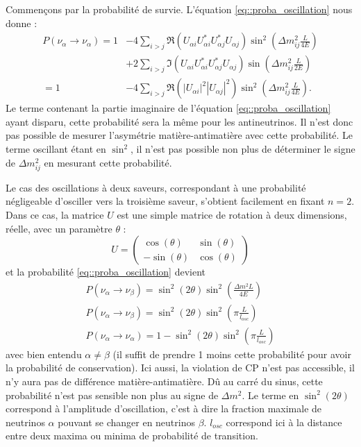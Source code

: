         Commençons par la probabilité de survie. L'équation \eqref{eq::proba_oscillation} nous donne :
        \begin{equation}\label{eq::proba_non_oscillation}
          \begin{split}
            P(\nu_{\alpha}\to\nu_{\alpha}) = 1 & - 4\sum_{i>j}\Re(U_{\alpha i}U_{\alpha i}^*U_{\alpha j}^*U_{\alpha j})\sin^2\left(\Delta m_{ij}^2\frac{L}{4E}\right) \\
            & + 2\sum_{i>j}\Im(U_{\alpha i}U_{\alpha i}^*U_{\alpha j}^*U_{\alpha j})\sin\left(\Delta m_{ij}^2\frac{L}{2E}\right) \\
            = 1 & -4\sum_{i>j}\Re(|U_{\alpha i}|^2|U_{\alpha j}|^2)\sin^2\left(\Delta m_{ij}^2\frac{L}{4E}\right).
          \end{split}
        \end{equation}
        Le terme contenant la partie imaginaire de l'équation \eqref{eq::proba_oscillation} ayant disparu, cette probabilité sera la même pour les antineutrinos. Il n'est donc pas possible de mesurer l'asymétrie matière-antimatière avec cette probabilité. Le terme oscillant étant en $\sin^2$, il n'est pas possible non plus de déterminer le signe de $\Delta m_{ij}^2$ en mesurant cette probabilité.
        
        Le cas des oscillations à deux saveurs, correspondant à une probabilité négligeable d'osciller vers la troisième saveur, s'obtient facilement en fixant $n=2$. Dans ce cas, la matrice $U$ est une simple matrice de rotation à deux dimensions, réelle, avec un paramètre $\theta$ :
        \begin{equation}\label{eq::two_flavor_pmns}
          U = \left(\begin{matrix}
            \cos(\theta) & \sin(\theta) \\
            -\sin(\theta) & \cos(\theta)
          \end{matrix}\right)
        \end{equation}
        et la probabilité \eqref{eq::proba_oscillation} devient
        \begin{eqnarray}
          \label{eq::two_flavors}
          P(\nu_{\alpha}\to\nu_{\beta}) = \sin^2(2\theta)\sin^2\left(\frac{\Delta m^2 L}{4E}\right) \\ 
          \label{eq::two_flavors_length}
          P(\nu_{\alpha}\to\nu_{\beta}) = \sin^2(2\theta)\sin^2\left(\pi\frac{L}{l_{osc}}\right) \\
          \label{eq::two_flavors_survival}
          P(\nu_{\alpha}\to\nu_{\alpha}) = 1- \sin^2(2\theta)\sin^2\left(\pi\frac{L}{l_{osc}}\right)
        \end{eqnarray}
        avec bien entendu $\alpha\ne \beta$ (il suffit de prendre 1 moins cette probabilité pour avoir la probabilité de conservation). Ici aussi, la violation de CP n'est pas accessible, il n'y aura pas de différence matière-antimatière. Dû au carré du sinus, cette probabilité n'est pas sensible non plus au signe de $\Delta m^2$. Le terme en $\sin^2(2\theta)$ correspond à l'amplitude d'oscillation, c'est à dire la fraction maximale de neutrinos $\alpha$ pouvant se changer en neutrinos $\beta$. $l_{osc}$ correspond ici à la distance entre deux maxima ou minima de probabilité de transition.
        
